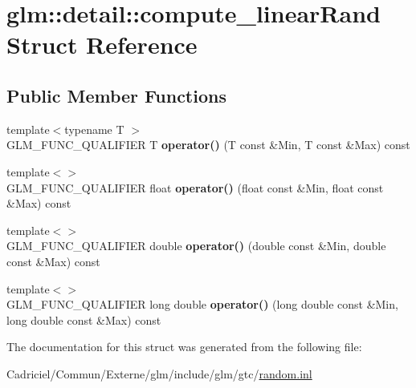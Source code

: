 \hypertarget{structglm_1_1detail_1_1compute__linear_rand}{}\section{glm\+:\+:detail\+:\+:compute\+\_\+linear\+Rand Struct Reference}
\label{structglm_1_1detail_1_1compute__linear_rand}
\subsection*{Public Member Functions}
\begin{DoxyCompactItemize}
\item 
{\footnotesize template$<$typename T $>$ }\\G\+L\+M\+\_\+\+F\+U\+N\+C\+\_\+\+Q\+U\+A\+L\+I\+F\+I\+ER T {\bfseries operator()} (T const \&Min, T const \&Max) const \hypertarget{structglm_1_1detail_1_1compute__linear_rand_ac852e16d66ba80ff5309238b3f494b99}{}\label{structglm_1_1detail_1_1compute__linear_rand_ac852e16d66ba80ff5309238b3f494b99}

\item 
{\footnotesize template$<$$>$ }\\G\+L\+M\+\_\+\+F\+U\+N\+C\+\_\+\+Q\+U\+A\+L\+I\+F\+I\+ER float {\bfseries operator()} (float const \&Min, float const \&Max) const \hypertarget{structglm_1_1detail_1_1compute__linear_rand_aeb6d4f603a9afa05544d65233064f2e9}{}\label{structglm_1_1detail_1_1compute__linear_rand_aeb6d4f603a9afa05544d65233064f2e9}

\item 
{\footnotesize template$<$$>$ }\\G\+L\+M\+\_\+\+F\+U\+N\+C\+\_\+\+Q\+U\+A\+L\+I\+F\+I\+ER double {\bfseries operator()} (double const \&Min, double const \&Max) const \hypertarget{structglm_1_1detail_1_1compute__linear_rand_a60dd37b36082f1a8dbfb8d34f0d5575c}{}\label{structglm_1_1detail_1_1compute__linear_rand_a60dd37b36082f1a8dbfb8d34f0d5575c}

\item 
{\footnotesize template$<$$>$ }\\G\+L\+M\+\_\+\+F\+U\+N\+C\+\_\+\+Q\+U\+A\+L\+I\+F\+I\+ER long double {\bfseries operator()} (long double const \&Min, long double const \&Max) const \hypertarget{structglm_1_1detail_1_1compute__linear_rand_ab5433863c50ed60a1ce5ac941759428f}{}\label{structglm_1_1detail_1_1compute__linear_rand_ab5433863c50ed60a1ce5ac941759428f}

\end{DoxyCompactItemize}


The documentation for this struct was generated from the following file\+:\begin{DoxyCompactItemize}
\item 
Cadriciel/\+Commun/\+Externe/glm/include/glm/gtc/\hyperlink{random_8inl}{random.\+inl}\end{DoxyCompactItemize}
